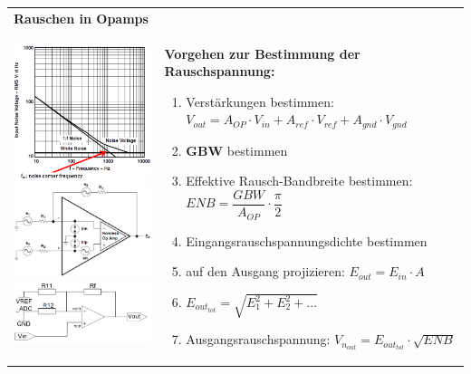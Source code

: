 \vspace{-2.5\topsep}
\begin{longtable}[t]{|p{4cm}|p{13.8cm}|}
    \hline  
    \multicolumn{2}{|l|}{\bf Rauschen in Opamps}
    \\ \hdashline
    \includegraphics[width=4cm, valign=t]{pictures/NoiseCornerFreq.png}\newline \vspace{0.5cm}\newline
    \includegraphics[width=4cm]{pictures/oampnoise.png} \newline \vspace{0.5cm} \newline
    \includegraphics[width=4cm]{pictures/RauschenSummierer}
    &{\textbf{Vorgehen zur Bestimmung der Rauschspannung:}
    \begin{enumerate}
      \setlength{\itemsep}{4pt}
      \item  Verstärkungen bestimmen: \newline
             $\boxed{V_{out} = A_{OP} \cdot V_{in} + A_{ref} \cdot V_{ref} + A_{gnd} \cdot V_{gnd}}$
      \item  \textbf{GBW} bestimmen
      \item  Effektive Rausch-Bandbreite bestimmen: \newline $\boxed{ENB = \dfrac{GBW}{A_{OP}} \cdot \dfrac{\pi}{2}} $
      \item  Eingangsrauschspannungsdichte bestimmen
      \item  auf den Ausgang projizieren: $\boxed{E_{out} = E_{in} \cdot A}$ 
      \item  $\boxed{E_{out_{tot}} = \sqrt{E_1^2 + E_2^2 + \ldots}}$
      \item  Ausgangsrauschspannung: $\boxed{V_{n_{out}} = E_{out_{tot}} \cdot \sqrt{ENB}}$
    \end{enumerate}

}
\end{longtable}
